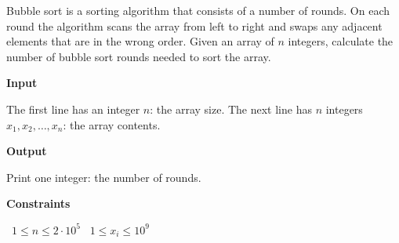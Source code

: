 Bubble sort is a sorting algorithm that consists of a number of rounds. On each round the algorithm scans the array from left to right and swaps any adjacent elements that are in the wrong order.
Given an array of $n$ integers, calculate the number of bubble sort rounds needed to sort the array.

\vspace{0.3cm}\noindent\textbf{Input}

The first line has an integer $n$: the array size.
The next line has $n$ integers $x_1,x_2,\dots,x_n$: the array contents.

\vspace{0.3cm}\noindent\textbf{Output}

Print one integer: the number of rounds.

\vspace{0.3cm}\noindent\textbf{Constraints}

\textbullet\ $1 \le n \le 2 \cdot 10^5$
\textbullet\ $1 \le x_i \le 10^9$